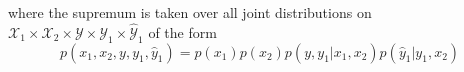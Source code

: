 \documentclass[preview]{standalone}
\begin{document}
\begin{center}
where the supremum is taken over all joint distributions on $\mathscr{X}_1 \times \mathscr{X}_2 \times \mathscr{Y} \times \mathscr{Y}_1 \times \mathscr{\hat{Y}}_1$ of the form \[p(x_1,x_2,y,y_1,\hat{y}_1) = p(x_1)p(x_2)p(y,y_1|x_1,x_2)p(\hat{y}_1|y_1,x_2)\]
\end{center}
\end{document}
